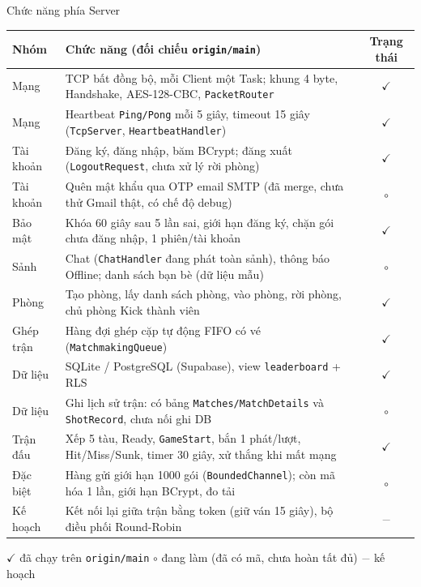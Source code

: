 \documentclass[aspectratio=169,9pt]{beamer}
\newcommand{\tickDone}{\textcolor{green!50!black}{$\checkmark$}}
\newcommand{\tickHalf}{\textcolor{orange!80!black}{$\circ$}}
\newcommand{\tickNone}{\textcolor{gray}{$-$}}
\begin{document}
\begin{frame}[label=tinhnangsv]{Chức năng phía Server}
  \scriptsize
  \renewcommand{\arraystretch}{1.04}
  \begin{tabularx}{\textwidth}{@{}l Y c@{}}
    \toprule \textbf{Nhóm} & \textbf{Chức năng (đối chiếu \texttt{origin/main})} & \textbf{Trạng thái} \\ \midrule
    Mạng & TCP bất đồng bộ, mỗi Client một Task; khung 4 byte, Handshake, AES-128-CBC, \texttt{PacketRouter} & \tickDone \\
    Mạng & Heartbeat \texttt{Ping/Pong} mỗi 5 giây, timeout 15 giây (\texttt{TcpServer}, \texttt{HeartbeatHandler}) & \tickDone \\
    Tài khoản & Đăng ký, đăng nhập, băm BCrypt; đăng xuất (\texttt{LogoutRequest}, chưa xử lý rời phòng) & \tickDone \\
    Tài khoản & Quên mật khẩu qua OTP email SMTP (đã merge, chưa thử Gmail thật, có chế độ debug) & \tickHalf \\
    Bảo mật & Khóa 60 giây sau 5 lần sai, giới hạn đăng ký, chặn gói chưa đăng nhập, 1 phiên/tài khoản & \tickDone \\
    Sảnh & Chat (\texttt{ChatHandler} đang phát toàn sảnh), thông báo Offline; danh sách bạn bè (dữ liệu mẫu) & \tickHalf \\
    Phòng & Tạo phòng, lấy danh sách phòng, vào phòng, rời phòng, chủ phòng Kick thành viên & \tickDone \\
    Ghép trận & Hàng đợi ghép cặp tự động FIFO có vé (\texttt{MatchmakingQueue}) & \tickDone \\
    Dữ liệu & SQLite / PostgreSQL (Supabase), view \texttt{leaderboard} + RLS & \tickDone \\
    Dữ liệu & Ghi lịch sử trận: có bảng \texttt{Matches/MatchDetails} và \texttt{ShotRecord}, chưa nối ghi DB & \tickHalf \\
    Trận đấu & Xếp 5 tàu, Ready, \texttt{GameStart}, bắn 1 phát/lượt, Hit/Miss/Sunk, timer 30 giây, xử thắng khi mất mạng & \tickDone \\
    Đặc biệt & Hàng gửi giới hạn 1000 gói (\texttt{BoundedChannel}); còn mã hóa 1 lần, giới hạn BCrypt, đo tải & \tickHalf \\
    Kế hoạch & Kết nối lại giữa trận bằng token (giữ ván 15 giây), bộ điều phối Round-Robin & \tickNone \\
    \bottomrule
  \end{tabularx}
  \par\vspace{0.05cm}
  {\tiny \tickDone{} đã chạy trên \texttt{origin/main} \quad \tickHalf{} đang làm (đã có mã, chưa hoàn tất đủ) \quad \tickNone{} kế hoạch}
\end{frame}
\end{document}
